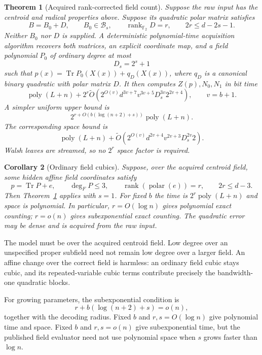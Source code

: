 \documentclass[11pt]{article}
\newtheorem{theorem}{Theorem}[section]
\newtheorem{corollary}[theorem]{Corollary}
\theoremstyle{remark}\newtheorem{remark}[theorem]{Remark}
\newcommand{\F}{\mathbb F}
\newcommand{\Tr}{\operatorname{Tr}}
\newcommand{\rank}{\operatorname{rank}}
\newcommand{\poly}{\operatorname{poly}}
\newcommand{\softO}{\widetilde O}
\begin{document}
\begin{theorem}[Acquired rank-corrected field count]\label{thm:main}
Suppose the raw input has the centroid and radical properties above. Suppose its quadratic polar matrix satisfies
\[
 B=B_0+D,\qquad B_0\in\mathcal B_s,\qquad
 \rank_{\F_2}D=r,\qquad 2r\le d-2s-1.
\]
Neither $B_0$ nor $D$ is supplied. A deterministic polynomial-time acquisition algorithm recovers both matrices, an explicit coordinate map, and a field polynomial $P_0$ of ordinary degree at most
\[
 D_s=2^s+1
\]
such that $p(x)=\Tr P_0(X(x))+q_D(X(x))$, where $q_D$ is a canonical binary quadratic with polar matrix $D$. It then computes $Z(p),N_0,N_1$ in bit time
\begin{equation}\label{eq:explicitcost}
 \poly(L+n)+2^r\softO\!\left(
 2^{O(v)}d^{3v+7}v^{3v+5}D_s^{3v}2^{2v+4}\right),
 \qquad v=b+1.
\end{equation}
A simpler uniform upper bound is
\[
 2^{r+O(b(\log(n+2)+s))}\poly(L+n).
\]
The corresponding space bound is
\[
 \poly(L+n)+\softO\!\left(
 2^{O(v)}d^{2v+4}v^{2v+3}D_s^{2v}2\right).
\]
Walsh leaves are streamed, so no $2^r$ space factor is required.
\end{theorem}

\begin{corollary}[Ordinary field cubics]
Suppose, over the acquired centroid field, some hidden affine field coordinates satisfy
\[
 p=\Tr P+e,\qquad \deg_F P\le3,
 \qquad \rank(\operatorname{polar}(e))=r,
 \qquad 2r\le d-3.
\]
Then Theorem~\ref{thm:main} applies with $s=1$. For fixed $b$ the time is $2^r\poly(L+n)$ and space is polynomial. In particular, $r=O(\log n)$ gives polynomial exact counting; $r=o(n)$ gives subexponential exact counting. The quadratic error may be dense and is acquired from the raw input.
\end{corollary}

The model must be over the acquired centroid field. Low degree over an unspecified proper subfield need not remain low degree over a larger field. An affine change over the correct field is harmless: an ordinary field cubic stays cubic, and its repeated-variable cubic terms contribute precisely the bandwidth-one quadratic blocks.

For growing parameters, the subexponential condition is
\[
 r+b(\log(n+2)+s)=o(n),
\]
together with the decoding radius. Fixed $b$ and $r,s=O(\log n)$ give polynomial time and space. Fixed $b$ and $r,s=o(n)$ give subexponential time, but the published field evaluator need not use polynomial space when $s$ grows faster than $\log n$.
\end{document}
